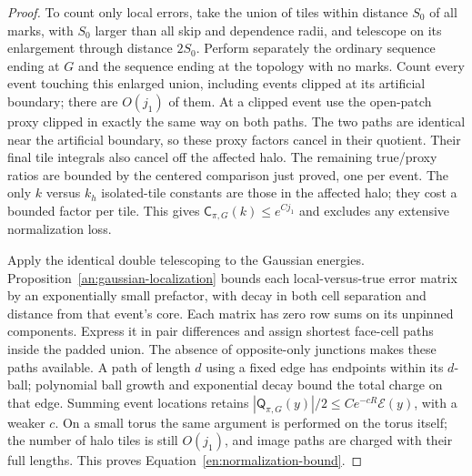 \begin{proof}
To count only local errors, take the union of tiles within distance
$S_0$ of all marks, with $S_0$ larger than all skip and dependence
radii, and telescope on its enlargement through distance $2S_0$.
Perform separately the ordinary sequence ending at $G$ and the
sequence ending at the topology with no marks.  Count every event
touching this enlarged union, including events clipped at its artificial
boundary; there are $O(j_1)$ of them.  At a clipped event use the
open-patch proxy clipped in exactly the same way on both paths.
The two paths are identical near the artificial boundary, so these
proxy factors cancel in their quotient.  Their final tile integrals
also cancel off the affected halo.  The remaining true/proxy ratios
are bounded by the centered comparison just proved, one per event.
The only $k$ versus $k_h$ isolated-tile constants are those in the
affected halo; they cost a bounded factor per tile.  This gives
$\mathsf C_{\pi,G}(k)\le e^{Cj_1}$ and excludes any extensive
normalization loss.

Apply the identical double telescoping to the Gaussian energies.
Proposition~\ref{an:gaussian-localization} bounds each local-versus-true
error matrix by an exponentially small prefactor, with decay in both
cell separation and distance from that event's core.  Each matrix has
zero row sums on its unpinned components.  Express it in pair
differences and assign shortest face-cell paths inside the padded
union.  The absence of opposite-only junctions makes these paths
available.  A path of length $d$ using a fixed edge has endpoints
within its $d$-ball; polynomial ball growth and exponential decay
bound the total charge on that edge.  Summing event locations retains
$|\mathsf Q_{\pi,G}(y)|/2\le Ce^{-cR}\mathcal E(y)$, with a weaker $c$.
On a small torus the same
argument is performed on the torus itself; the number of halo tiles
is still $O(j_1)$, and image paths are charged with their full lengths.
This proves Equation~\eqref{en:normalization-bound}.
\end{proof}

